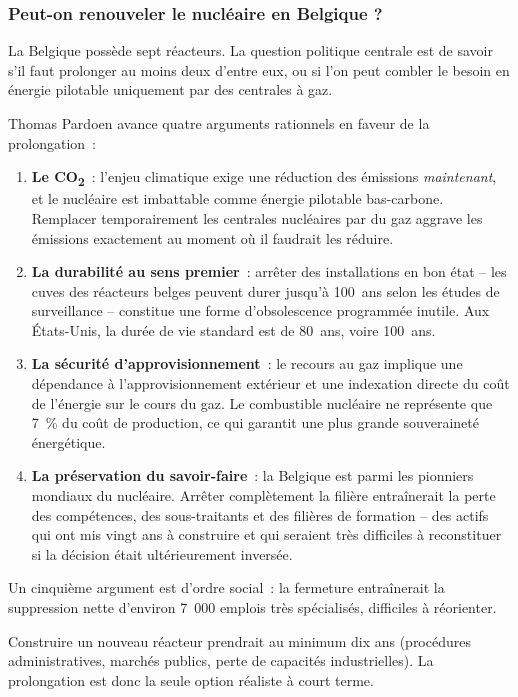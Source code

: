 \subsubsection{Peut-on renouveler le nucléaire en Belgique ?}

La Belgique possède sept réacteurs. La question politique centrale est de savoir s'il faut prolonger au moins deux d'entre eux, ou si l'on peut combler le besoin en énergie pilotable uniquement par des centrales à gaz.

Thomas Pardoen avance quatre arguments rationnels en faveur de la prolongation~:

\begin{enumerate}
    \item \textbf{Le CO\textsubscript{2}}~: l'enjeu climatique exige une réduction des émissions \emph{maintenant}, et le nucléaire est imbattable comme énergie pilotable bas-carbone. Remplacer temporairement les centrales nucléaires par du gaz aggrave les émissions exactement au moment où il faudrait les réduire.
    \item \textbf{La durabilité au sens premier}~: arrêter des installations en bon état -- les cuves des réacteurs belges peuvent durer jusqu'à 100~ans selon les études de surveillance -- constitue une forme d'obsolescence programmée inutile. Aux États-Unis, la durée de vie standard est de 80~ans, voire 100~ans.
    \item \textbf{La sécurité d'approvisionnement}~: le recours au gaz implique une dépendance à l'approvisionnement extérieur et une indexation directe du coût de l'énergie sur le cours du gaz. Le combustible nucléaire ne représente que 7~\% du coût de production, ce qui garantit une plus grande souveraineté énergétique.
    \item \textbf{La préservation du savoir-faire}~: la Belgique est parmi les pionniers mondiaux du nucléaire. Arrêter complètement la filière entraînerait la perte des compétences, des sous-traitants et des filières de formation -- des actifs qui ont mis vingt ans à construire et qui seraient très difficiles à reconstituer si la décision était ultérieurement inversée.
\end{enumerate}

Un cinquième argument est d'ordre social~: la fermeture entraînerait la suppression nette d'environ 7~000 emplois très spécialisés, difficiles à réorienter.

Construire un nouveau réacteur prendrait au minimum dix ans (procédures administratives, marchés publics, perte de capacités industrielles). La prolongation est donc la seule option réaliste à court terme.

